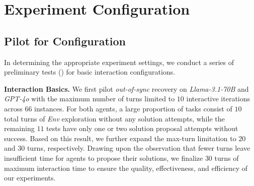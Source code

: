 





\section{Experiment Configuration}
\label{Appendix B: Experiment Configs}

\renewcommand{\thefigure}{B\arabic{figure}} %
\renewcommand{\thetable}{B\arabic{table}}   %
\setcounter{figure}{0} %
\setcounter{table}{0}  %



\subsection{Pilot for Configuration}
In determining the appropriate experiment settings, we conduct a series of preliminary tests () for basic interaction configurations. 

\textbf{Interaction Basics.} We first pilot \textit{out-of-sync} recovery on \textit{Llama-3.1-70B} and \textit{GPT-4o} with the maximum number of turns limited to $10$ interactive iterations across $66$ instances. For both agents, a large proportion of tasks consist of $10$ total turns of \textit{Env} exploration without any solution attempts, while the remaining $11$ tests have only one or two solution proposal attempts without success. Based on this result, we further expand the max-turn limitation to $20$ and $30$ turns, respectively. Drawing upon the observation that fewer turns leave insufficient time for agents to propose their solutions, we finalize $30$ turns of maximum interaction time to ensure the quality, effectiveness, and efficiency of our experiments. 

